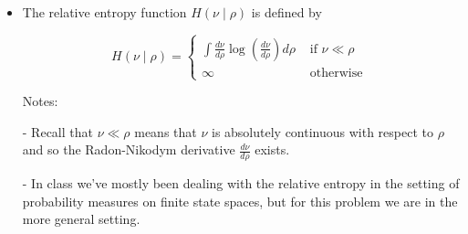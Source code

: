 \begin{itemize}
then show that

\[
I_\rho^2(\nu)=H(\bar{\nu} \mid \rho)+H(\nu \mid \bar{\nu} \times \bar{\nu})
\]
\begin{proof}
	\begin{align*}
		& H(\overline{\nu}  | \rho) + H(\nu | \overline{\nu}  \times \overline{\nu} )\\
		&= \sum_i \overline{\nu} _i \log \frac{\overline{\nu} _i}{\rho_i} + \sum_{i j}\nu_{i j}\log \frac{\nu_{i j}}{\overline{\nu} _i \overline{\nu} _j} \\
		&= \sum_{i j} \nu_{i j}\left( \log \frac{\overline{\nu} _i}{\rho_i} + \log \frac{\nu_{i j}}{\overline{\nu} _i \overline{\nu} _j} \right)  \\
		&= \sum_{i j} \nu_{i j} \log \frac{\nu_{i j}}{\rho_i \overline{\nu} _j} \\
		&= I^2_\rho(\nu)
	.\end{align*}
\end{proof}

\item
The relative entropy function $H(\nu \mid \rho)$ is defined by

\[
H(\nu \mid \rho)= \begin{cases}\int \frac{d \nu}{d \rho} \log \left(\frac{d \nu}{d \rho}\right) d \rho & \text { if } \nu \ll \rho \\ \infty & \text { otherwise }\end{cases}
\]


Notes:


- Recall that $\nu \ll \rho$ means that $\nu$ is absolutely continuous with respect to $\rho$ and so the Radon-Nikodym derivative $\frac{d \nu}{d \rho}$ exists.

- In class we've mostly been dealing with the relative entropy in the setting of probability measures on finite state spaces, but for this problem we are in the more general setting.


\end{itemize}
